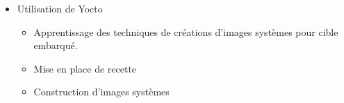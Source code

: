 \documentclass[11pt,a4paper,sans]{moderncv}   %
\begin{document}
{\begin{itemize}
\begin{itemize}
   \item Générations d'images systèmes, noyau, U-boot...
   \item Création d'une distribution Linux embarquée personnalisée.
   \item Ce projet n'a pas été industrialisé
  \end{itemize}
\item Utilisation de Yocto
  \begin{itemize}
   \item Apprentissage des techniques de créations d'images systèmes pour cible embarqué.
   \item Mise en place de recette
   \item Construction d'images systèmes
  \end{itemize}
\end{itemize}}
\end{document}
